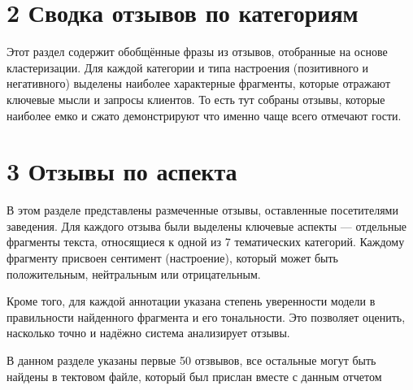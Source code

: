 \documentclass[a4paper,12pt]{extarticle}
\begin{document}
\section*{2 Сводка отзывов по категориям}
\vspace{1em}

Этот раздел содержит обобщённые фразы из отзывов, отобранные на основе кластеризации.
Для каждой категории и типа настроения (позитивного и негативного) выделены наиболее характерные фрагменты,
которые отражают ключевые мысли и запросы клиентов.
То есть тут собраны отзывы, которые наиболее емко и сжато демонстрируют что именно чаще всего отмечают гости.



\newpage
\section*{3 Отзывы по аспекта}

В этом разделе представлены размеченные отзывы, оставленные посетителями заведения. Для каждого отзыва были выделены ключевые аспекты — отдельные фрагменты текста, относящиеся к одной из 7 тематических категорий. Каждому фрагменту присвоен сентимент (настроение), который может быть положительным, нейтральным или отрицательным.

Кроме того, для каждой аннотации указана степень уверенности модели в правильности найденного фрагмента и его тональности. Это позволяет оценить, насколько точно и надёжно система анализирует отзывы.

В данном разделе указаны первые 50 отзвывов, все остальные могут быть найдены в тектовом файле, который был прислан вместе с данным отчетом


\end{document}
